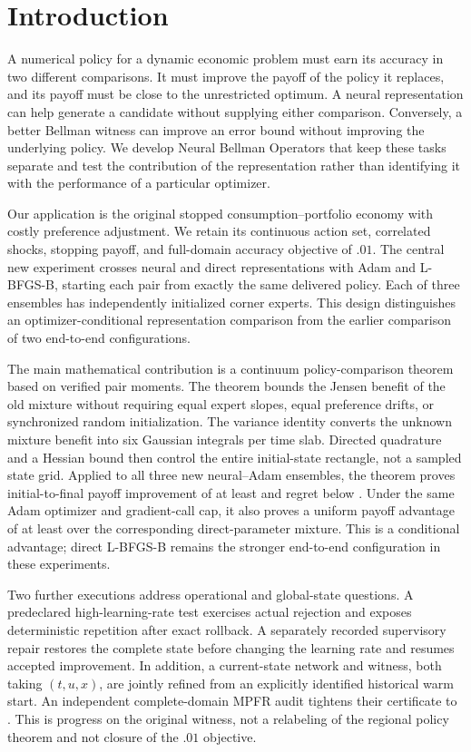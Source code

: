 \section{Introduction}\label{sec:r22intro}
A numerical policy for a dynamic economic problem must earn its accuracy in two different comparisons. It must improve the payoff of the policy it replaces, and its payoff must be close to the unrestricted optimum. A neural representation can help generate a candidate without supplying either comparison. Conversely, a better Bellman witness can improve an error bound without improving the underlying policy. We develop Neural Bellman Operators that keep these tasks separate and test the contribution of the representation rather than identifying it with the performance of a particular optimizer.

Our application is the original stopped consumption--portfolio economy with costly preference adjustment. We retain its continuous action set, correlated shocks, stopping payoff, and full-domain accuracy objective of $.01$. The central new experiment crosses neural and direct representations with Adam and L-BFGS-B, starting each pair from exactly the same delivered policy. Each of three ensembles has independently initialized corner experts. This design distinguishes an optimizer-conditional representation comparison from the earlier comparison of two end-to-end configurations.

The main mathematical contribution is a continuum policy-comparison theorem based on verified pair moments. The theorem bounds the Jensen benefit of the old mixture without requiring equal expert slopes, equal preference drifts, or synchronized random initialization. The variance identity converts the unknown mixture benefit into six Gaussian integrals per time slab. Directed quadrature and a Hessian bound then control the entire initial-state rectangle, not a sampled state grid. Applied to all three new neural--Adam ensembles, the theorem proves initial-to-final payoff improvement of at least \RXXIIGainMin{} and regret below \RXXIINeuralRegret{}. Under the same Adam optimizer and gradient-call cap, it also proves a uniform payoff advantage of at least \RXXIIConditionalGain{} over the corresponding direct-parameter mixture. This is a conditional advantage; direct L-BFGS-B remains the stronger end-to-end configuration in these experiments.

Two further executions address operational and global-state questions. A predeclared high-learning-rate test exercises actual rejection and exposes deterministic repetition after exact rollback. A separately recorded supervisory repair restores the complete state before changing the learning rate and resumes accepted improvement. In addition, a current-state network and witness, both taking $(t,u,x)$, are jointly refined from an explicitly identified historical warm start. An independent complete-domain MPFR audit tightens their certificate to \RXXIIGlobalBound{}. This is progress on the original witness, not a relabeling of the regional policy theorem and not closure of the $.01$ objective.

